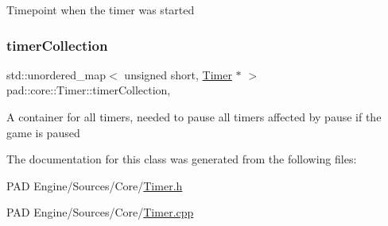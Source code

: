 Timepoint when the timer was started \mbox{\label{classpad_1_1core_1_1_timer_a57359f64301ebdbd74a257ca1ce45e1c}} 
\subsubsection{\texorpdfstring{timer\+Collection}{timerCollection}}
{\footnotesize\ttfamily std\+::unordered\+\_\+map$<$ unsigned short, \mbox{\hyperlink{classpad_1_1core_1_1_timer}{Timer}} $\ast$ $>$ pad\+::core\+::\+Timer\+::timer\+Collection\hspace{0.3cm}{\ttfamily [static]}, {\ttfamily [private]}}

A container for all timers, needed to pause all timers affected by pause if the game is paused 

The documentation for this class was generated from the following files\+:\begin{DoxyCompactItemize}
\item 
P\+A\+D Engine/\+Sources/\+Core/\mbox{\hyperlink{_timer_8h}{Timer.\+h}}\item 
P\+A\+D Engine/\+Sources/\+Core/\mbox{\hyperlink{_timer_8cpp}{Timer.\+cpp}}\end{DoxyCompactItemize}

